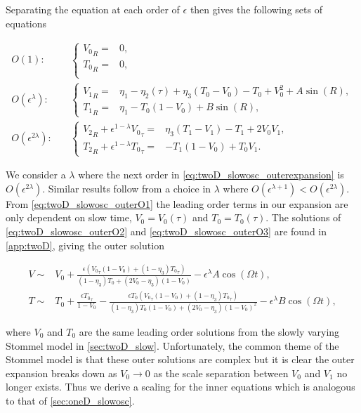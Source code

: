 Separating the equation at each order of $\epsilon$ then gives the following sets of equations

\begin{align}
\label{eq:twoD_slowosc_outerO1}
O(1):\quad & \begin{cases}
	{V_0}_R =& 0, \\
	{T_0}_R =& 0,\\
\end{cases}\\
\label{eq:twoD_slowosc_outerO2}
O(\epsilon^\lambda):\quad & \begin{cases}
	{V_1}_R = & \eta_1-\eta_2(\tau) +\eta_3(T_0-V_0)-T_0+V_0^2+A\sin(R),\\
	{T_1}_R =& \eta_1-T_0(1-V_0)+B\sin(R),
\end{cases}\\
\label{eq:twoD_slowosc_outerO3}
O(\epsilon^{2\lambda}):\quad & \begin{cases}
	{V_2}_R+\epsilon^{1-\lambda}{V_0}_\tau = & \eta_3(T_1-V_1)-T_1+2V_0V_1,\\
	{T_2}_R +\epsilon^{1-\lambda}{T_0}_\tau =& -T_1(1-V_0)+T_0V_1.
\end{cases}
\end{align}

We consider a $\lambda$ where the next order in \eqref{eq:twoD_slowosc_outerexpansion} is $O(\epsilon^{2\lambda})$. Similar results follow from a choice in $\lambda$ where $O(\epsilon^{\lambda+1})<O(\epsilon^{2\lambda})$. From \eqref{eq:twoD_slowosc_outerO1} the leading order terms in our expansion are only dependent on slow time, $V_0=V_0(\tau)$ and $T_0=T_0(\tau)$. The solutions of \eqref{eq:twoD_slowosc_outerO2} and \eqref{eq:twoD_slowosc_outerO3} are found in \autoref{app:twoD}, giving the outer solution 

\begin{equation}\label{eq:twoD_slowosc_outersoln}
\begin{aligned}
V\sim& V_0 + \frac{\epsilon({V_0}_\tau(1-V_0)+(1-\eta_3){T_0}_\tau)}{(1-\eta_3)T_0+(2V_0-\eta_3)(1-V_0)}-\epsilon^\lambda A \cos(\Omega t),\\
T\sim& T_0 + \frac{\epsilon {T_0}_\tau}{1-V_0}-\frac{\epsilon T_0({V_0}_\tau(1-V_0)+(1-\eta_3){T_0}_\tau)}{(1-\eta_3)T_0(1-V_0)+(2V_0-\eta_3)(1-V_0)^2}-\epsilon^\lambda B \cos(\Omega t),
\end{aligned}
\end{equation}

where $V_0$ and $T_0$ are the same leading order solutions from the slowly varying Stommel model in \autoref{sec:twoD_slow}. Unfortunately, the common theme of the Stommel model is that these outer solutions are complex but it is clear the outer expansion breaks down as $V_0\to 0$ as the scale separation between $V_0$ and $V_1$ no longer exists. Thus we derive a scaling for the inner equations which is analogous to that of \autoref{sec:oneD_slowosc}.

